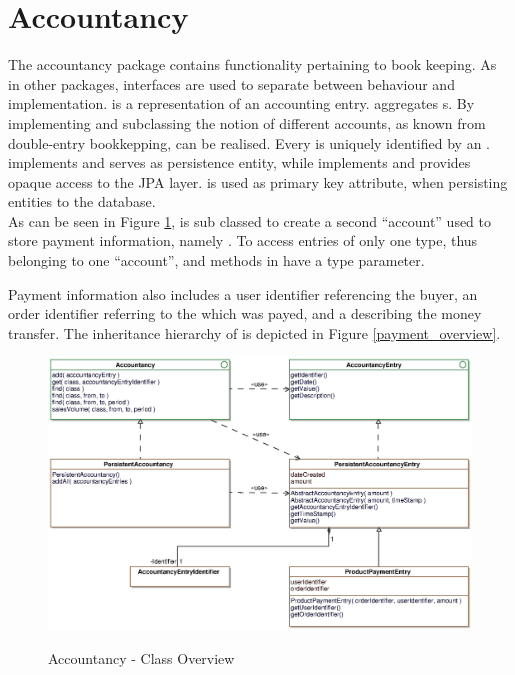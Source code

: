 \newpage
\section{Accountancy}
\label{sec:accountancy}

The accountancy package contains functionality pertaining to book keeping.
As in other packages, interfaces are used to separate between behaviour and implementation.
 is a representation of an accounting entry.
 aggregates s.
By implementing and subclassing  the notion of different accounts, as known from double-entry bookkepping, can be realised.
Every  is uniquely identified by an .
\\

 implements  and serves as persistence entity, while  implements  and provides opaque access to the JPA layer.
 is used as primary key attribute, when persisting entities to the database.
\\

As can be seen in Figure \ref{accountancy_overview},  is sub classed to create a second ``account'' used to store payment information, namely .
To access entries of only one type, thus belonging to one ``account'',  and  methods in  have a type parameter.

Payment information also includes a user identifier referencing the buyer, an order identifier referring to the  which was payed, and a  describing the money transfer.
The inheritance hierarchy of  is depicted in Figure \ref{payment_overview}.
\begin{figure}
	\centering
  \includegraphics[width=1.0\textwidth]{images/Accountancy_Overview.eps}
	\label{accountancy_overview}
	\caption{Accountancy - Class Overview}
\end{figure}

